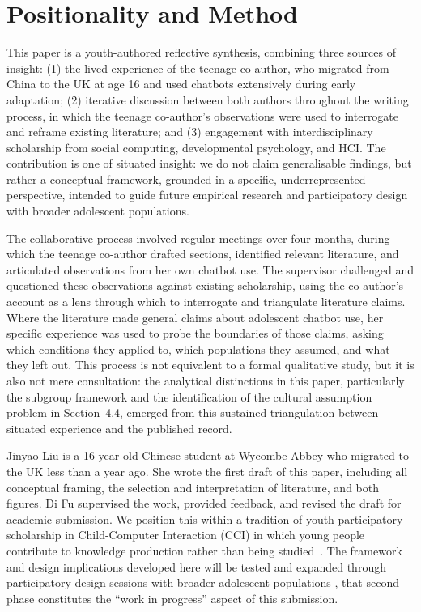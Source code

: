 \documentclass[manuscript]{acmart}
\begin{document}
\section{Positionality and Method}

This paper is a youth-authored reflective synthesis, combining three sources of
insight: (1) the lived experience of the teenage co-author, who migrated from China to the
UK at age 16 and used chatbots extensively during early adaptation; (2) iterative discussion
between both authors throughout the writing process, in which the teenage co-author's
observations were used to interrogate and reframe existing literature; and (3) engagement
with interdisciplinary scholarship from social computing, developmental psychology, and HCI.
The contribution is one of situated insight: we do not claim generalisable findings,
but rather a conceptual framework, grounded in a specific, underrepresented perspective, intended to guide future empirical research and participatory design with broader adolescent
populations.

The collaborative process involved regular meetings over four months, during which the
teenage co-author drafted sections, identified relevant literature, and articulated
observations from her own chatbot use. The supervisor challenged and questioned these
observations against existing scholarship, using the co-author's account as a lens through
which to interrogate and triangulate literature claims. Where the literature made general
claims about adolescent chatbot use, her specific experience was used to probe the
boundaries of those claims, asking which conditions they applied to, which populations
they assumed, and what they left out. This process is not equivalent to a formal qualitative
study, but it is also not mere consultation: the analytical distinctions in this paper,
particularly the subgroup framework and the identification of the cultural assumption problem
in Section~4.4, emerged from this sustained triangulation between situated experience and
the published record. 

Jinyao Liu is a 16-year-old Chinese student at Wycombe Abbey who migrated to the UK less
than a year ago. She wrote the first draft of this paper, including all conceptual framing,
the selection and interpretation of literature, and both figures. Di Fu supervised the work,
provided feedback, and revised the draft for academic submission. We position this within a
tradition of youth-participatory scholarship in Child-Computer Interaction (CCI) in which young people contribute to
knowledge production rather than being studied~\cite{Hawke2025,yu2025youth}. The framework
and design implications developed here will be tested and expanded through participatory
design sessions with broader adolescent populations , that second phase constitutes the
``work in progress'' aspect of this submission.
\end{document}
